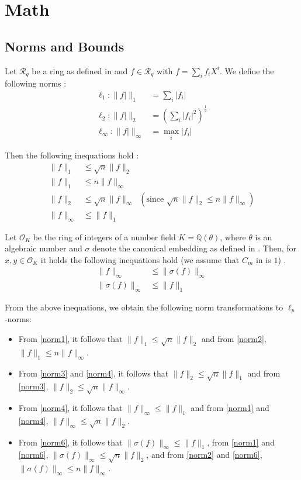 \documentclass[
  a4paper,  %
  twoside,  %
  bibliography=totoc,
  headsepline,
  cleardoublepage=empty,
  parskip=half,
  draft=false
]{scrbook}
\begin{document}
\section{Math} 
\subsection{Norms and Bounds} %
Let $\mathcal{R}_q$ be a ring as defined in \cite{BDLOP18} and $f \in \mathcal{R}_q$ with $f = \sum_i f_i X^i$. We define the following norms \cite{BDLOP18}:
\begin{align}
  \ell_1 : \| f| \|_1 &= \sum_i |f_i|\\
  \ell_2 : \| f| \|_2 &= \left(\sum_i |f_i|^2\right) ^{\frac{1}{2}}\\
  \ell_\infty : \| f| \|_\infty &= \max_i |f_i|
\end{align}

Then the following inequations hold \cite{BDLOP18}:
\begin{align}
  \| f \|_1 &\leq \sqrt{n} \| f \|_2 \label{norm1}\\
  \| f \|_1 &\leq n \| f \|_\infty \label{norm2}\\
  \| f \|_2 &\leq \sqrt{n} \| f \|_\infty \;\;(\text{since }  \sqrt{n} \| f \|_2 \leq n \| f \|_\infty) \label{norm3}\\
  \| f \|_\infty& \leq \| f \|_1 \label{norm4}
\end{align}

Let $\mathcal{O}_K$ be the ring of integers of a number field $K=\mathbb{Q}(\theta)$, where $\theta$ is an algebraic number and $\sigma$ denote the canonical embedding as defined in \cite{DPSZ12}. Then, for $x, y \in \mathcal{O}_K$ it holds the following inequations hold (we assume that $C_m$ in \cite{DPSZ12} is $1$) \cite{DPSZ12}. 
\begin{align}
  \| f \|_\infty &\leq \| \sigma(f) \|_\infty \label{norm5}\\
  \| \sigma(f) \|_\infty &\leq \| f \|_1 \label{norm6}
\end{align}

From the above inequations, we obtain the following norm transformations to $\ell_p$-norms:
\begin{itemize}
  \item From \cref{norm1}, it follows that $\| f \|_1 \leq \sqrt{n} \| f \|_2$ and from \cref{norm2}, $\| f \|_1 \leq n \| f \|_\infty$.
  \item From \cref{norm3} and \cref{norm4}, it follows that $\| f \|_2 \leq \sqrt{n}  \| f \|_1$ and from \cref{norm3}, $\| f \|_2 \leq \sqrt{n}  \| f \|_\infty$.
  \item From \cref{norm4}, it follows that $\| f \|_\infty \leq  \| f \|_1$ and from \cref{norm1} and \cref{norm4}, $\| f \|_\infty \leq \sqrt{n}  \| f \|_2$.
  \item From \cref{norm6}, it follows that $\| \sigma(f) \|_\infty \leq  \| f \|_1$, from \cref{norm1} and \cref{norm6}, $\| \sigma(f) \|_\infty \leq \sqrt{n}  \| f \|_2$, and from \cref{norm2} and \cref{norm6}, $\| \sigma(f) \|_\infty \leq n  \| f \|_\infty$.
\end{itemize}
\end{document}
